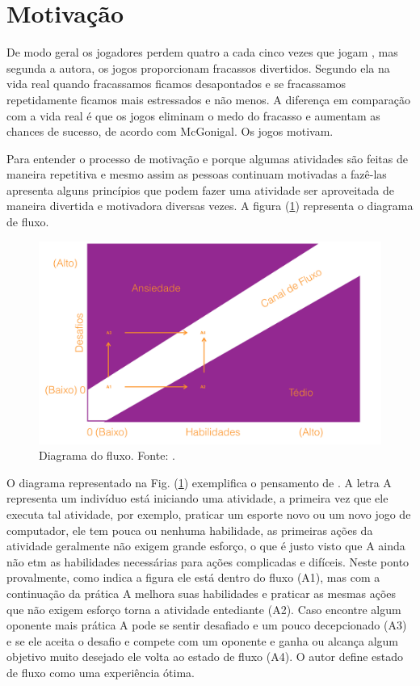 \section{Motivação}

De modo geral os jogadores perdem quatro a cada cinco vezes que jogam \cite{mcgonigal2011reality}, mas segunda a autora, os jogos proporcionam fracassos divertidos. Segundo ela na vida real quando fracassamos ficamos desapontados e se fracassamos repetidamente ficamos mais estressados e não menos. A diferença em comparação com a vida real é que os jogos eliminam o medo do fracasso e aumentam as chances de sucesso, de acordo com McGonigal. Os jogos motivam.

Para entender o processo de motivação e porque algumas atividades são feitas de maneira repetitiva e mesmo assim as pessoas continuam motivadas a fazê-las \cite{1990flow} apresenta alguns princípios que podem fazer uma atividade ser aproveitada de maneira divertida e motivadora diversas vezes. A figura (\ref{flowfig}) representa o diagrama de fluxo.


\begin{figure}[h]
	\centering
		\includegraphics[keepaspectratio=true,scale=0.5]{figuras/flowfig.png}
	\caption{Diagrama do fluxo. Fonte: \cite{1990flow}.\label{flowfig}
}
\end{figure}


O diagrama representado na Fig. (\ref{flowfig}) exemplifica o pensamento de \cite{1990flow}. A letra A representa um indivíduo está iniciando uma atividade, a primeira vez que ele executa tal atividade, por exemplo, praticar um esporte novo ou um novo jogo de computador, ele tem pouca ou nenhuma habilidade, as primeiras ações da atividade geralmente não exigem grande esforço, o que é justo visto que A ainda não etm as habilidades necessárias para ações complicadas e difíceis. Neste ponto provalmente, como indica a figura ele está dentro do fluxo (A1), mas com a continuação da prática A melhora suas habilidades e praticar as mesmas ações que não exigem esforço torna a atividade entediante (A2). Caso encontre algum oponente mais prática A pode se sentir desafiado e um pouco decepcionado (A3) e se ele aceita o desafio e compete com um oponente e ganha ou alcança algum objetivo muito desejado ele volta ao estado de fluxo (A4). O autor define estado de fluxo como uma experiência ótima.

